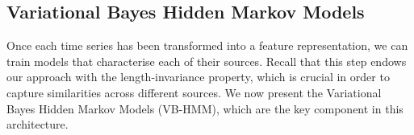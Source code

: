 \documentclass[pdftex,11pt,a4paper]{article}
\theoremstyle{definition}
\theoremstyle{remark}
\begin{document}
\subsection{Variational Bayes Hidden Markov Models} \label{sub_hmms}
Once each time series has been transformed into a feature representation, we can train models that characterise each of their sources. Recall that this step endows our approach with the length-invariance property, which is crucial in order to capture similarities across different sources. We now present the Variational Bayes Hidden Markov Models (VB-HMM), which are the key component in this architecture.

\end{document}
